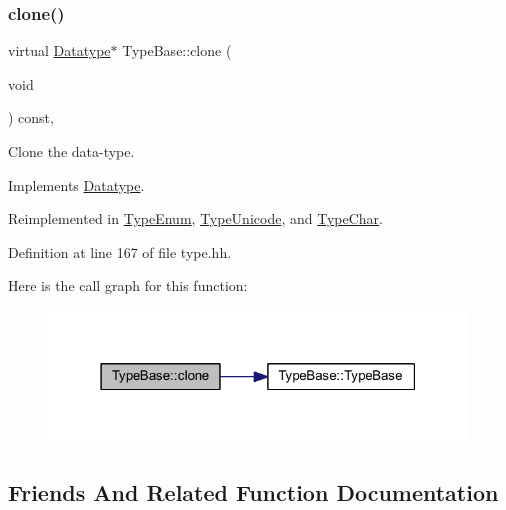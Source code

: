 \subsubsection{\texorpdfstring{clone()}{clone()}}
{\footnotesize\ttfamily virtual \mbox{\hyperlink{class_datatype}{Datatype}}$\ast$ Type\+Base\+::clone (\begin{DoxyParamCaption}\item[{void}]{ }\end{DoxyParamCaption}) const\hspace{0.3cm}{\ttfamily [inline]}, {\ttfamily [virtual]}}



Clone the data-\/type. 



Implements \mbox{\hyperlink{class_datatype_a6bd032d91f40efe36841adc85b3ff0ec}{Datatype}}.



Reimplemented in \mbox{\hyperlink{class_type_enum_ac5592c52de3d1ccad25cd9e1e20126d7}{Type\+Enum}}, \mbox{\hyperlink{class_type_unicode_ab347e36debf5530b33cbfa2b329f9554}{Type\+Unicode}}, and \mbox{\hyperlink{class_type_char_af09a0ae04e18990511b4f3bda2141559}{Type\+Char}}.



Definition at line 167 of file type.\+hh.

Here is the call graph for this function\+:
\nopagebreak
\begin{figure}[H]
\begin{center}
\leavevmode
\includegraphics[width=315pt]{class_type_base_ad506116cf9bf5bc6d13654b38609d184_cgraph}
\end{center}
\end{figure}


\subsection{Friends And Related Function Documentation}
\mbox{\label{class_type_base_ac8c1945d0a63785e78b3e09a13226ed6}} 
